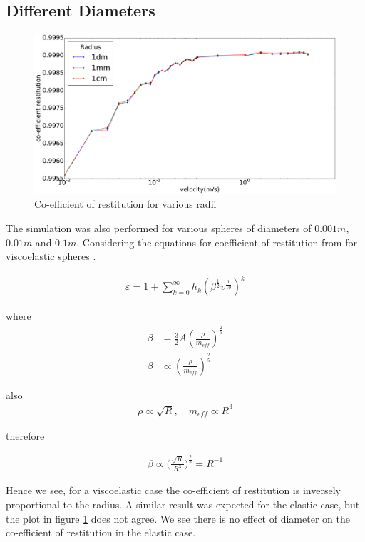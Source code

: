 
\subsection{Different Diameters}

\begin{figure}[H]
\includegraphics[width=1.0\textwidth]{../images/parametricStudy/CORvsVELdiffDAI_pdf.pdf}
\caption{Co-efficient of restitution for various radii}
\label{fig:CORDiffDia}
\end{figure}

The simulation was also performed for various spheres of diameters of $0.001m$, $0.01m$ and $0.1m$. Considering the equations for coefficient of restitution from \citep{muller} for viscoelastic spheres .

\begin{align*}
\varepsilon = 1+ \sum_{k=0}^{\infty} h_{k}(\beta^{\frac{1}{2}} v^{\frac{1}{10}})^{k} 
\end{align*}

where
\begin{align*}
\beta &= \frac{3}{2} A (\frac{\rho}{m_{eff}})^{\frac{2}{5}} \\
\beta &\propto (\frac{\rho}{m_{eff}})^{\frac{2}{5}}
\end{align*}

also 
\begin{align*}
\rho \propto \sqrt{R}, \quad m_{eff} \propto R^{3}
\end{align*}

therefore

\begin{align*}
\beta \propto \Big( \frac{\sqrt{R}}{R^{3}} \Big)^{\frac{2}{5}} = R^{-1}
\end{align*}

Hence we see, for a viscoelastic case the co-efficient of restitution is inversely proportional to the radius. A similar result was expected for the elastic case, but the plot in figure \ref{fig:CORDiffDia} does not agree. We see there is no effect of diameter on the co-efficient of restitution in the elastic case.



